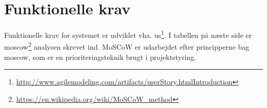 \section{Funktionelle krav}\label{FunkKrav}
Funktionelle krav for systemet er udviklet vha. \gls{us}\footnote{\url{http://www.agilemodeling.com/artifacts/userStory.htmlIntroduction}}.
I tabellen på næste side er \gls{moscow}\footnote{\url{https://en.wikipedia.org/wiki/MoSCoW_method}} analysen skrevet ind. MoSCoW er udarbejdet efter principperne bag \gls{moscow}, som er en prioriteringsteknik brugt i projektstyring.


%